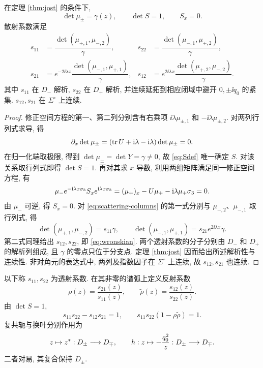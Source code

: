 \begin{proposition}\label{prop:scattering}
在定理 \ref{thm:jost} 的条件下,
\begin{equation}\label{eq:detjost}
\det\mu_\pm=\gamma(z),\qquad \det S=1,\qquad S_x=0.
\end{equation}
散射系数满足
\begin{align}
s_{11}&=\dfrac{\det(\mu_{+,1},\mu_{-,2})}{\gamma},&
s_{22}&=\dfrac{\det(\mu_{-,1},\mu_{+,2})}{\gamma},\label{eq:wronskian}\\
s_{21}&=e^{-2\ii\lambda x}\dfrac{\det(\mu_{-,1},\mu_{+,1})}{\gamma},&
s_{12}&=e^{2\ii\lambda x}\dfrac{\det(\mu_{+,2},\mu_{-,2})}{\gamma}.\nonumber
\end{align}
其中 $s_{11}$ 在 $D_-$ 解析, $s_{22}$ 在 $D_+$ 解析, 并连续延拓到相应闭域中避开 $0,\pm\ii q_0$ 的紧集. $s_{12},s_{21}$ 在 $\Sigma^\circ$ 上连续.
\end{proposition}
\begin{proof}
修正空间方程的第一、第二列分别含有右乘项 $\ii\lambda\mu_{\pm,1}$ 和 $-\ii\lambda\mu_{\pm,2}$.
对两列行列式求导, 得
\begin{equation*}
\partial_x\det\mu_\pm=(\operatorname{tr} U+\mathrm{i}\lambda-\mathrm{i}\lambda)\det\mu_\pm=0.
\end{equation*}
在归一化端取极限, 得到 $\det\mu_\pm=\det Y=\gamma\ne0$,
故 \eqref{eq:Sdef} 唯一确定 $S$. 对该关系取行列式即得 $\det S=1$.
再对其求 $x$ 导数, 利用两组矩阵满足同一修正空间方程, 有
\begin{equation*}
\mu_-e^{-\mathrm{i}\lambda x\sigma_3}S_xe^{\mathrm{i}\lambda x\sigma_3}
=(\mu_+)_x-U\mu_+-\mathrm{i}\lambda\mu_+\sigma_3=0.
\end{equation*}
由 $\mu_-$ 可逆, 得 $S_x=0$. 对 \eqref{eq:scattering-columns} 的第一式分别与 $\mu_{-,2}$、$\mu_{-,1}$ 取行列式, 得
\begin{equation*}
\det(\mu_{+,1},\mu_{-,2})=s_{11}\gamma,\qquad
\det(\mu_{-,1},\mu_{+,1})=s_{21}e^{2\ii\lambda x}\gamma.
\end{equation*}
第二式同理给出 $s_{12},s_{22}$, 即 \eqref{eq:wronskian}.
两个透射系数的分子分别由 $D_-$ 和 $D_+$ 的解析列组成, 且 $\gamma$ 的零点只位于分支点.
定理 \ref{thm:jost} 因而给出所述解析性与连续性.
非对角元的表达式中, 两列及指数因子在 $\Sigma^\circ$ 上连续, 故 $s_{12},s_{21}$ 也连续.
\end{proof}

以下称 $s_{11},s_{22}$ 为透射系数. 在其非零的谱弧上定义反射系数
\begin{equation}\label{eq:reflection}
\rho(z)=\dfrac{s_{21}(z)}{s_{11}(z)},\qquad
\widetilde\rho(z)=\dfrac{s_{12}(z)}{s_{22}(z)}.
\end{equation}
由 $\det S=1$,
\begin{equation}\label{eq:scattering-determinant}
s_{11}s_{22}-s_{12}s_{21}=1,\qquad
s_{11}s_{22}(1-\rho\widetilde\rho)=1.
\end{equation}
复共轭与换叶分别作用为
\begin{equation}\label{eq:symmetry-domains}
z\mapsto{z}^{*}:D_\pm\longrightarrow D_\mp,\qquad
h:z\mapsto-\dfrac{q_0^2}{z}:D_\pm\longrightarrow D_\mp.
\end{equation}
二者对易, 其复合保持 $D_\pm$.

